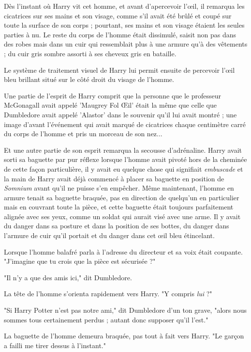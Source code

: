 Dès l'instant où Harry vit cet homme, et avant d'apercevoir l'œil, il remarqua les cicatrices sur ses mains et son visage, comme s'il avait été brûlé et coupé sur toute la surface de son corps ; pourtant, ses mains et son visage étaient les seules parties à nu. Le reste du corps de l'homme était dissimulé, saisit non pas dans des robes mais dans un cuir qui ressemblait plus à une armure qu'à des vêtements ; du cuir gris sombre assorti à ses cheveux gris en bataille.

Le système de traitement visuel de Harry lui permit ensuite de percevoir l'œil bleu brillant situé sur le côté droit du visage de l'homme.

Une partie de l'esprit de Harry comprit que la personne que le professeur McGonagall avait appelé 'Maugrey Fol Œil' était la même que celle que Dumbledore avait appelé 'Alastor' dans le souvenir qu'il lui avait montré ; une image d'avant l'événement qui avait marqué de cicatrices chaque centimètre carré du corps de l'homme et pris un morceau de son nez...

Et une autre partie de son esprit remarqua la secousse d'adrénaline. Harry avait sorti sa baguette par pur réflexe lorsque l'homme avait pivoté hors de la cheminée de cette façon particulière, il y avait eu quelque chose qui signifiait \emph{embuscade}  et la main de Harry avait déjà commencé à placer sa baguette en position de \emph{Somnium}  avant qu'il ne puisse s'en empêcher. Même maintenant, l'homme en armure tenait sa baguette braquée, pas en direction de quelqu'un en particulier mais en couvrant toute la pièce, et cette baguette était toujours parfaitement alignée avec ses yeux, comme un soldat qui aurait visé avec une arme. Il y avait du danger dans sa posture et dans la position de ses bottes, du danger dans l'armure de cuir qu'il portait et du danger dans cet œil bleu étincelant.

Lorsque l'homme balafré parla à l'adresse du directeur et sa voix était coupante. "J'imagine que tu crois que la pièce est sécurisée ?"

"Il n'y a que des amis ici," dit Dumbledore.

La tête de l'homme s'orienta rapidement vers Harry. "Y compris \emph{lui}  ?"

"Si Harry Potter n'est pas notre ami," dit Dumbledore d'un ton grave, "alors nous sommes tous certainement perdus ; autant donc supposer qu'il l'est."

La baguette de l'homme demeura braquée, pas tout à fait vers Harry. "Le garçon a failli me tirer dessus à l'instant."

